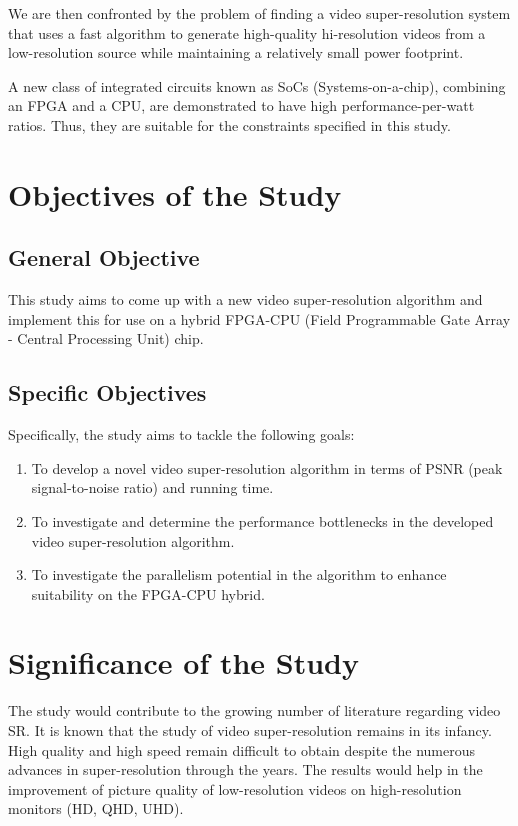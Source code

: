 We are then confronted by the problem of finding a video super-resolution system that uses a fast algorithm to generate high-quality hi-resolution videos from a low-resolution source while maintaining a relatively small power footprint.

A new class of integrated circuits known as SoCs (Systems-on-a-chip), combining an FPGA and a CPU, are demonstrated to have high performance-per-watt ratios.
Thus, they are suitable for the constraints specified in this study.

\section{Objectives of the Study}

\subsection{General Objective}

This study aims to come up with a new video super-resolution algorithm and implement this for use on a hybrid FPGA-CPU (Field Programmable Gate Array - Central Processing Unit) chip.


\subsection{Specific Objectives}

Specifically, the study aims to tackle the following goals:

\begin{enumerate}
	\item To develop a novel video super-resolution algorithm in terms of PSNR (peak signal-to-noise ratio) and running time. 
	\item To investigate and determine the performance bottlenecks in the developed video super-resolution algorithm.
	\item To investigate the parallelism potential in the algorithm to enhance suitability on the FPGA-CPU hybrid.
\end{enumerate}

\section{Significance of the Study}
The study would contribute to the growing number of literature regarding video SR. 	
It is known that the study of video super-resolution remains in its infancy.
High quality and high speed remain difficult to obtain despite the numerous advances in super-resolution through the years.
The results would help in the improvement of picture quality of low-resolution videos on high-resolution monitors (HD, QHD, UHD).


